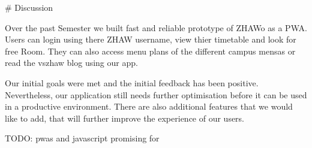 \begin{markdown}

# Discussion

Over the past Semester we built fast and reliable prototype of ZHAWo as a PWA. Users can login using there ZHAW username, view thier timetable and look for free Room. They can also access menu plans of the different campus mensas or read the vszhaw blog using our app.

Our initial goals were met and the initial feedback has been positive. Nevertheless, our application still needs further optimisation before it can be used in a productive environment. There are also additional features that we would like to add, that will further improve the experience of our users.

TODO: pwas and javascript promising for 

\end{markdown}
